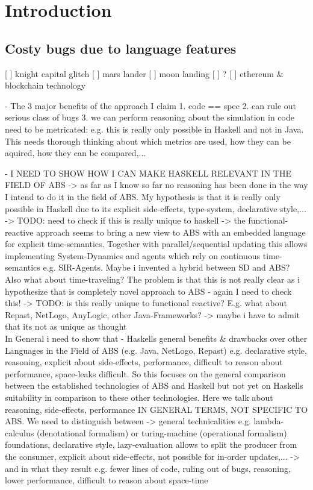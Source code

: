 \section{Introduction}


\subsection{Costy bugs due to language features}
[ ] knight capital glitch
[ ] mars lander
[ ] moon landing
[ ] ?
[ ] ethereum \& blockchain technology

- The 3 major benefits of the approach I claim
	1. code == spec
	2. can rule out serious class of bugs
	3. we can perform reasoning about the simulation in code
	need to be metricated: e.g. this is really only possible in Haskell and not in Java. This needs thorough thinking about which metrics are used, how they can be aquired, how they can be compared,...
	
- I NEED TO SHOW HOW I CAN MAKE HASKELL RELEVANT IN THE FIELD OF ABS
	-> as far as I know so far no reasoning has been done in the way I intend to do it in the field of ABS. My hypothesis is that it is really only possible in Haskell due to its explicit side-effects, type-system, declarative style,... 
		-> TODO: need to check if this is really unique to haskell
	-> the functional-reactive approach seems to bring a new view to ABS with an embedded language for explicit time-semantics. Together with parallel/sequential updating this allows implementing System-Dynamics and agents which rely on continuous time-semantics e.g. SIR-Agents. Maybe i invented a hybrid between SD and ABS? Also what about time-traveling? The problem is that this is not really clear as i hypothesize that is completely novel approach to ABS - again I need to check this!
		-> TODO: is this really unique to functional reactive? E.g. what about Repast, NetLogo, AnyLogic, other Java-Frameworks? 
	-> maybe i have to admit that its not as unique as thought\\
	
In General i need to show that
- Haskells general benefits \& drawbacks over other Languages in the Field of ABS (e.g. Java, NetLogo, Repast) e.g. declarative style, reasoning, explicit about side-effects, performance, difficult to reason about performance, space-leaks difficult. So this focuses on the general comparison between the established technologies of ABS and Haskell but not yet on Haskells suitability in comparison to these other technologies. Here we talk about reasoning, side-effects, performance IN GENERAL TERMS, NOT SPECIFIC TO ABS. We need to distinguish between 
	-> general technicalities e.g. lambda-calculus (denotational formalism) or turing-machine (operational formalism) foundations, declarative style, lazy-evaluation allows to split the producer from the consumer, explicit about side-effects, not possible for in-order updates,...
	-> and in what they result e.g. fewer lines of code, ruling out of bugs, reasoning, lower performance, difficult to reason about space-time 
	
